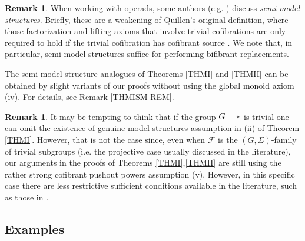 \documentclass[a4paper,10pt
]{article}%
\numberwithin{equation}{section}
\numberwithin{figure}{section}
\theoremstyle{definition} %
\newtheorem{remark}[equation]{Remark}%
\newcommand{\Cat}{\mathsf{Cat}}
\newcommand{\F}{\ensuremath{\mathcal F}}
\newcommand{\V}{\ensuremath{\mathcal V}}
\newcommand{\1}{\ensuremath{\mathbbm 1}}%
\begin{document}
\begin{remark}\label{SEMI_REM}
	When working with operads, some authors (e.g. \cite{Spi,Whi17,WY18})
	discuss \emph{semi-model structures}.
	Briefly, these are a weakening of Quillen's original definition,
	where those factorization and lifting axioms
	that involve trivial cofibrations
	are only required to hold if the trivial cofibration 
	has cofibrant source \cite[\S 2.2]{WY18}.
	We note that, in particular, semi-model structures suffice for 
	performing %
	bifibrant replacements.
        
	The semi-model structure analogues of 
	Theorems \ref{THMI} and \ref{THMII}
	can be obtained by slight variants of our proofs
	without using the global monoid axiom (iv).
	For details, see Remark \ref{THMISM REM}.
\end{remark}



\begin{remark}\label{GTRIV REM}
	It may be tempting to think that if the group $G=\**$ is trivial
	one can omit the existence of genuine model structures assumption in (ii) of Theorem \ref{THMI}.
	However, that is not the case since, 
	even when $\F$ is the $(G,\Sigma)$-family of trivial subgroups
	(i.e. the projective case usually discussed in the literature),
	our arguments in the proofs of Theorems \ref{THMI},\ref{THMII}
	are still using the rather strong
	cofibrant pushout powers assumption (v).
	However, in this specific case 
	there are less restrictive sufficient conditions available in the literature, such as those in \cite[Thm. 1.1]{PS18}.
%
 \end{remark}





\subsection{Examples}\label{EXAMPLES SEC}
\end{document}
